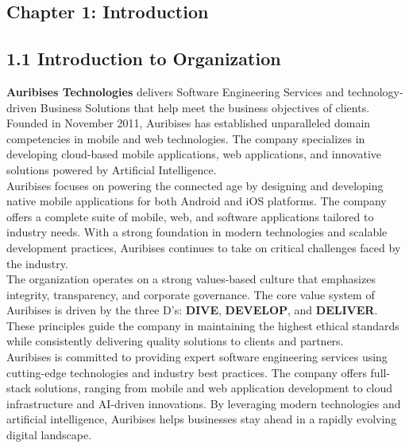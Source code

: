 \documentclass[12pt, oneside]{article}
\begin{document}
\newpage
{} %
\setcounter{page}{1}

\begin{center}
    \section*{Chapter 1: Introduction}
\end{center}

\subsection*{1.1 Introduction to Organization}
\textbf{Auribises Technologies} delivers Software Engineering Services and technology-driven Business Solutions that help meet the business objectives of clients. Founded in November 2011, Auribises has established unparalleled domain competencies in mobile and web technologies. The company specializes in developing cloud-based mobile applications, web applications, and innovative solutions powered by Artificial Intelligence.\\[0.25cm]
Auribises focuses on powering the connected age by designing and developing native mobile applications for both Android and iOS platforms. The company offers a complete suite of mobile, web, and software applications tailored to industry needs. With a strong foundation in modern technologies and scalable development practices, Auribises continues to take on critical challenges faced by the industry.\\[0.25cm]
The organization operates on a strong values-based culture that emphasizes integrity, transparency, and corporate governance. The core value system of Auribises is driven by the three D's: \textbf{DIVE}, \textbf{DEVELOP}, and \textbf{DELIVER}. These principles guide the company in maintaining the highest ethical standards while consistently delivering quality solutions to clients and partners.\\[0.25cm]
Auribises is committed to providing expert software engineering services using cutting-edge technologies and industry best practices. The company offers full-stack solutions, ranging from mobile and web application development to cloud infrastructure and AI-driven innovations. By leveraging modern technologies and artificial intelligence, Auribises helps businesses stay ahead in a rapidly evolving digital landscape.\\[0.25cm]
\end{document}
